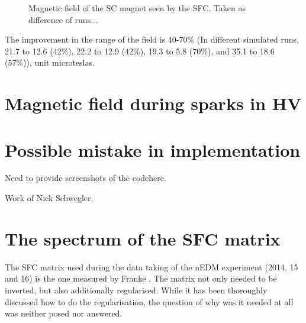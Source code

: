 \begin{figure}
  \myfloatalign
  \quad
  \caption{Magnetic field of the SC magnet seen by the SFC. Taken as difference of runs...}
\end{figure}

The improvement in the range of the field is 40-70\% (In different simulated runs, 21.7 to 12.6 (42\%), 22.2 to 12.9 (42\%), 19.3 to 5.8 (70\%), and 35.1 to 18.6 (57\%)), unit microteslas.


\section{Magnetic field during sparks in HV}




\section{Possible mistake in implementation}
Need to provide screenshots of the codehere.

Work of Nick Schwegler.


\section{The spectrum of the SFC matrix}
\label{sec:nedm_sfc_matrix}
The SFC matrix used during the data taking of the nEDM experiment (2014, 15 and 16) is the one measured by Franke \cite{Franke2013}. The matrix not only needed to be inverted, but also additionally regularised. While it has been thoroughly discussed how to do the regularisation, the question of why was it needed at all was neither posed nor answered.

